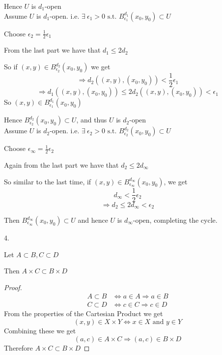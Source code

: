 \documentclass{article}
\begin{document}
\begin{problem}
\begin{solution}
	Hence \( U \) is \( d_{1} \)-open
	\\

	Assume \( U \) is \( d_{1} \)-open. i.e. \( \exists \ \epsilon_1 > 0 \text{ s.t. } B_{\epsilon_{1}}^{d_{1}}(x_{0},y_{0}) \subset U \)

	Choose \( \epsilon_2 = \frac{1}{2}\epsilon_{1} \)

	From the last part we have that \( d_1 \le 2d_{2} \)

	So if \( (x,y) \in B_{\epsilon_{2}}^{d_{2}}(x_{0},y_{0}) \) we get
	\[
		\Rightarrow d_2((x,y),(x_{0},y_{0})) < \frac{1}{2} \epsilon_{1}
	\]
	\[
		\Rightarrow d_{1}((x,y),(x_{0},y_{0})) \le 2d_{2}((x,y),(x_{0},y_{0})) < \epsilon_{1}
	\]
	So \( (x,y) \in B_{\epsilon_{1}}^{d_{1}}(x_{0},y_{0})\)

	Hence \( B_{\epsilon_{2}}^{d_{2}}(x_{0},y_{0}) \subset U \), and thus \( U \) is \( d_2 \)-open
	\\

	Assume \( U \) is \( d_2 \)-open. i.e. \( \exists \ \epsilon_{2} > 0 \text{ s.t. } B_{\epsilon_{2}}^{d_{2}}(x_{0},y_{0}) \subset U \)

	Choose \( \epsilon_{\infty} = \frac{1}{2}\epsilon_{2} \)

	Again from the last part we have that \( d_2 \le 2d_{\infty} \)

	So similar to the last time, if \( (x,y) \in  B_{\epsilon_{\infty}}^{d_{\infty}}(x_{0},y_{0}) \), we get
	\[
		d_{\infty} < \frac{1}{2} \epsilon_{2}
	\]
	\[
		\Rightarrow d_2 \le 2d_{\infty} < \epsilon_{2}
	\]

	Then \( B_{\epsilon_{\infty}}^{d_{\infty}}(x_{0},y_{0}) \subset U \) and hence \( U \) is \( d_{\infty} \)-open, completing the cycle.
\end{solution}

\begin{solution}4.
	\begin{lemma}
		Let \( A \subset B, C \subset D \)

		Then \( A\times C \subset B\times D \)

		\begin{proof}
			\begin{align*}
				A \subset B & \iff a \in A \Rightarrow a \in B \\
				C \subset D & \iff c \in C \Rightarrow c \in D
			\end{align*}
			From the properties of the Cartesian Product we get
			\[
				(x,y) \in  X\times Y \iff x \in X \text{ and } y \in Y
			\]
			Combining these we get
			\[
				(a,c) \in A \times C \Rightarrow (a,c) \in B \times D
			\]
			Therefore \( A \times C \subset B \times  D \)
		\end{proof}
	\end{lemma}


\end{solution}
\end{problem}
\end{document}
